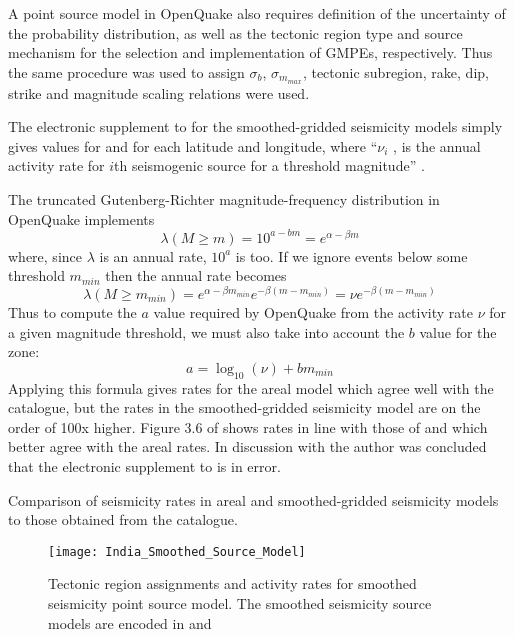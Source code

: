 \documentclass{article}
\begin{document}
A point source model in OpenQuake also requires definition of the uncertainty of the probability distribution, as well as the tectonic region type and source mechanism for the selection and implementation of GMPEs, respectively. Thus the same procedure was used to assign $\sigma_b$, $\sigma_{m_{max}}$, tectonic subregion, rake, dip, strike and magnitude scaling relations were used.

The electronic supplement to \cite{nath2012probabilistic} for the smoothed-gridded seismicity models simply gives values for \texttt{} and \texttt{} for each latitude and longitude, where ``$\nu_i$ , is the annual activity rate for $i$th seismogenic source for a threshold magnitude'' \cite[p.~140]{nath2012probabilistic}.

The truncated Gutenberg-Richter magnitude-frequency distribution in OpenQuake implements
$$\lambda(M \geq m) = 10^{a - b m} = e^{\alpha - \beta m}$$
where, since $\lambda$ is an annual rate, $10^a$ is too. If we ignore events below some threshold $m_{min}$ then the annual rate becomes
$$\lambda(M \geq m_{min}) = e^{\alpha - \beta m_{min}} e^{-\beta (m - m_{min})} = \nu e^{-\beta (m - m_{min})} $$
Thus to compute the $a$ value required by OpenQuake from the activity rate $\nu$ for a given magnitude threshold, we must also take into account the $b$ value for the zone:
$$a = \log_{10}(\nu) + b m_{min}$$
Applying this formula gives rates for the areal model which agree well with the catalogue, but the rates in the smoothed-gridded seismicity model are on the order of 100x higher. Figure 3.6 of \cite{thingbaijam2011synoptic} shows rates in line with those of \cite{thingbaijam2011seismogenic} and which better agree with the areal rates. In discussion with the author was concluded that the electronic supplement to \cite{nath2012probabilistic} is in error.

\begin{table}
\caption[Comparison of seismicity rates]{Comparison of seismicity rates in areal and smoothed-gridded seismicity models to those obtained from the catalogue.}
\label{table:Rates}
\centering

\end{table}

\begin{figure}[!htb]
\begin{adjustbox}{center}
\texttt{[image: India\_Smoothed\_Source\_Model]}
\end{adjustbox}
\caption[Smoothed seismicity point source model]{Tectonic region assignments and activity rates for smoothed seismicity point source model. The smoothed seismicity source models are encoded in \texttt{} and \texttt{}}
\label{fig:SmoothedSourceModel}
\end{figure}
\end{document}
